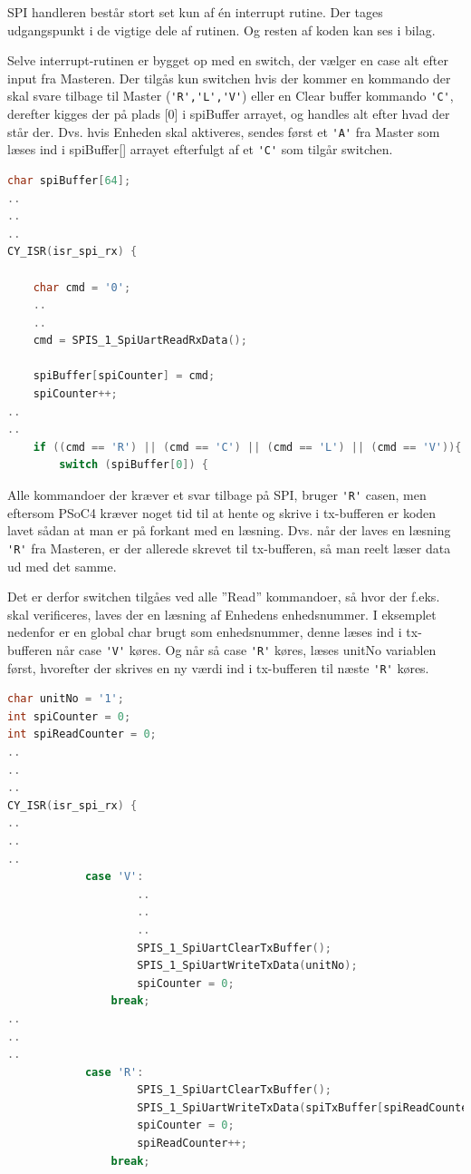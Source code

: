 SPI handleren består stort set kun af én interrupt rutine. Der tages udgangspunkt i de vigtige dele af rutinen. Og resten af koden kan ses i bilag.

Selve interrupt-rutinen er bygget op med en switch, der vælger en case alt efter input fra Masteren. Der tilgås kun switchen hvis der kommer en kommando der skal svare tilbage til Master (\verb+'R','L','V'+) eller en Clear buffer kommando \verb+'C'+, derefter kigges der på plads [0] i spiBuffer arrayet, og handles alt efter hvad der står der. Dvs. hvis Enheden skal aktiveres, sendes først et \verb+'A'+ fra Master som læses ind i spiBuffer[] arrayet efterfulgt af et \verb+'C'+ som tilgår switchen.
 
\begin{lstlisting}[language=C]
char spiBuffer[64];
..
..
..
CY_ISR(isr_spi_rx) {

	char cmd = '0';
	..
	.. 
	cmd = SPIS_1_SpiUartReadRxData(); 
    
    spiBuffer[spiCounter] = cmd;
    spiCounter++;
..
..
    if ((cmd == 'R') || (cmd == 'C') || (cmd == 'L') || (cmd == 'V')){
    	switch (spiBuffer[0]) {
\end{lstlisting}

Alle kommandoer der kræver et svar tilbage på SPI, bruger \verb+'R'+ casen, men eftersom PSoC4 kræver noget tid til at hente og skrive i tx-bufferen er koden lavet sådan at man er på forkant med en læsning. Dvs. når der laves en læsning \verb+'R'+ fra Masteren, er der allerede skrevet til tx-bufferen, så man reelt læser data ud med det samme. 

Det er derfor switchen tilgåes ved alle ''Read'' kommandoer, så hvor der f.eks. skal verificeres, laves der en læsning af Enhedens enhedsnummer. I eksemplet nedenfor er en global char brugt som enhedsnummer, denne læses ind i tx-bufferen når case \verb+'V'+ køres. Og når så case \verb+'R'+ køres, læses unitNo variablen først, hvorefter der skrives en ny værdi ind i tx-bufferen til næste \verb+'R'+ køres.

\begin{lstlisting}[language=C]
char unitNo = '1';
int spiCounter = 0;
int spiReadCounter = 0;
..
..
..
CY_ISR(isr_spi_rx) {
..
..
..
    		case 'V':
					..
					..
					..
                    SPIS_1_SpiUartClearTxBuffer();
                    SPIS_1_SpiUartWriteTxData(unitNo);
                    spiCounter = 0;
    			break;
..
..
..
            case 'R':
                    SPIS_1_SpiUartClearTxBuffer();
                    SPIS_1_SpiUartWriteTxData(spiTxBuffer[spiReadCounter]);
                    spiCounter = 0;
                    spiReadCounter++;
                break;
\end{lstlisting}